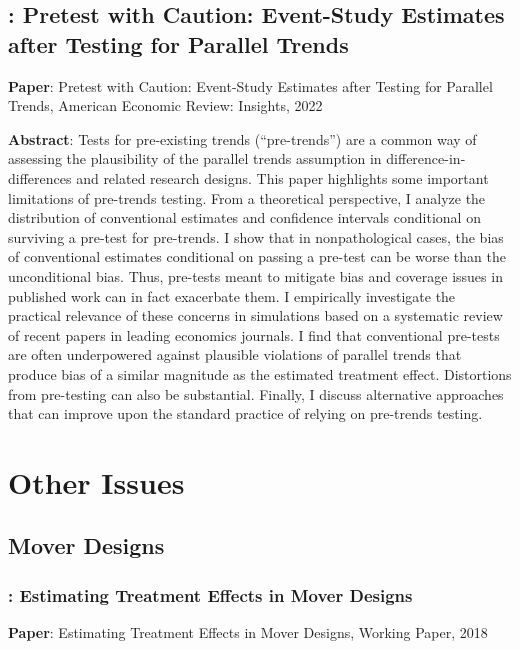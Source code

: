 \documentclass[12pt]{article}
\theoremstyle{definition}
\begin{document}
\subsection{\citet{rothPretestCautionEventStudy2022a}: Pretest with Caution: Event-Study Estimates after Testing for Parallel Trends}

{\bf Paper}: Pretest with Caution: Event-Study Estimates after Testing for Parallel Trends, American Economic Review: Insights, 2022

{\bf Abstract}: Tests for pre-existing trends (``pre-trends'') are a common way of assessing the plausibility of the parallel trends assumption in difference-in-differences and related research  designs. This paper highlights some important limitations of pre-trends testing. From  a theoretical perspective, I analyze the distribution of conventional estimates and confidence intervals conditional on surviving a pre-test for pre-trends. I show that in nonpathological cases, the bias of conventional estimates conditional on passing a pre-test  can be worse than the unconditional bias. Thus, pre-tests meant to mitigate bias and  coverage issues in published work can in fact exacerbate them. I empirically investigate  the practical relevance of these concerns in simulations based on a systematic review  of recent papers in leading economics journals. I find that conventional pre-tests are  often underpowered against plausible violations of parallel trends that produce bias of  a similar magnitude as the estimated treatment effect. Distortions from pre-testing can  also be substantial. Finally, I discuss alternative approaches that can improve upon the  standard practice of relying on pre-trends testing.

\section{Other Issues}

\subsection{Mover Designs}

\subsubsection{\citet{hullEstimatingTreatmentEffects2018}: Estimating Treatment Effects in Mover Designs}

{\bf Paper}: Estimating Treatment Effects in Mover Designs, Working Paper, 2018
\end{document}

